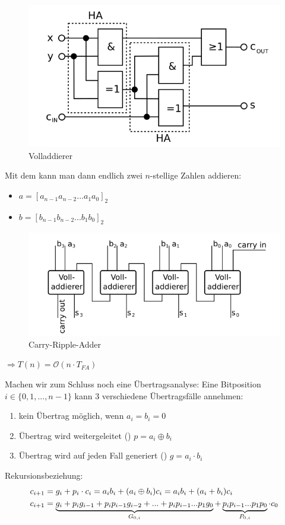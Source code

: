\begin{figure}[ht]
	\centering
	\includegraphics{images/Volladdierer.png}
	\caption{Volladdierer}
\end{figure}

Mit dem  kann man dann endlich zwei $n$-stellige Zahlen addieren:
\begin{itemize}
	\item $a=[a_{n-1}a_{n-2}...a_1a_0]_2$
	\item $b=[b_{n-1}b_{n-2}...b_1b_0]_2$
\end{itemize}

\begin{figure}[ht]
	\centering
	\includegraphics{images/Carry-Ripple-Adder.png}
	\caption{Carry-Ripple-Adder}
\end{figure}
$\Rightarrow T(n)=\mathcal{O}(n\cdot T_{FA})$

Machen wir zum Schluss noch eine Übertragsanalyse: Eine Bitposition $i\in\{0,1,...,n-1\}$ kann 3 verschiedene Übertragsfälle annehmen:
\begin{enumerate}
	\item kein Übertrag möglich, wenn $a_i=b_i=0$
	\item Übertrag wird weitergeleitet () $p=a_i\oplus b_i$
	\item Übertrag wird auf jeden Fall generiert () $g=a_i\cdot b_i$
\end{enumerate}

Rekursionsbeziehung:
\begin{align}
	c_{i+1} &= g_i+p_i\cdot c_i=a_ib_i+(a_i\oplus b_i)c_i=a_ib_i+(a_i+b_i)c_i \notag \\
	c_{i+1} &= \underbrace{g_i+p_ig_{i-1}+p_ip_{i-1}g_{i-2}+...+p_ip_{i-1}...p_1g_0}_{G_{0,i}} + \underbrace{p_ip_{i-1}...p_1p_0}_{P_{0,i}}\cdot c_0\notag
\end{align}